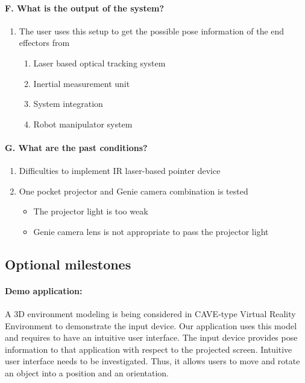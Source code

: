 \paragraph{F.	What is the output of the system?}

\begin{enumerate}
	\item The user uses this setup to get the possible pose information of the end effectors from 
	\begin{enumerate}
		\item Laser based optical tracking system
		\item Inertial measurement unit 
		\item System integration 
		\item Robot manipulator system
	\end{enumerate}
\end{enumerate}

\paragraph{G.	What are the past conditions?}
\begin{enumerate}
	\item Difficulties to implement IR laser-based pointer device
	\item One pocket projector and Genie camera combination is tested
	\begin{itemize}
		\item The projector light is too weak
		\item Genie camera lens is not appropriate to pass the projector light
	\end{itemize}
\end{enumerate}

\subsection{Optional milestones} \label{milestones}

\paragraph{Demo application:}


A 3D environment modeling is being considered in CAVE-type Virtual Reality Environment to demonstrate the input device. Our application uses this model and requires to have an intuitive user interface. The input device provides pose information to that application with respect to the projected screen. Intuitive user interface needs to be investigated. Thus, it allows users to move and rotate an object into a position and an orientation.   

